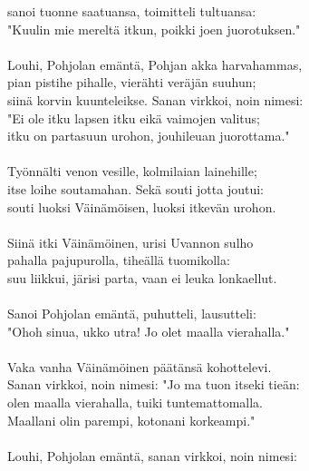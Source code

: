 sanoi tuonne saatuansa, toimitteli tultuansa:             \\
"Kuulin mie mereltä itkun, poikki joen juorotuksen."      \\
                                                          \\
Louhi, Pohjolan emäntä, Pohjan akka harvahammas,          \\
pian pistihe pihalle, vierähti veräjän suuhun;            \\
siinä korvin kuunteleikse. Sanan virkkoi, noin nimesi:    \\
"Ei ole itku lapsen itku eikä vaimojen valitus;           \\
itku on partasuun urohon, jouhileuan juorottama."         \\
                                                          \\
Työnnälti venon vesille, kolmilaian lainehille;           \\
itse loihe soutamahan. Sekä souti jotta joutui:           \\
souti luoksi Väinämöisen, luoksi itkevän urohon.          \\
                                                          \\
Siinä itki Väinämöinen, urisi Uvannon sulho               \\
pahalla pajupurolla, tiheällä tuomikolla:                 \\
suu liikkui, järisi parta, vaan ei leuka lonkaellut.      \\
                                                          \\
Sanoi Pohjolan emäntä, puhutteli, lausutteli:             \\
"Ohoh sinua, ukko utra! Jo olet maalla vierahalla."       \\
                                                          \\
Vaka vanha Väinämöinen päätänsä kohottelevi.              \\
Sanan virkkoi, noin nimesi: "Jo ma tuon itseki tieän:     \\
olen maalla vierahalla, tuiki tuntemattomalla.            \\
Maallani olin parempi, kotonani korkeampi."               \\
                                                          \\
Louhi, Pohjolan emäntä, sanan virkkoi, noin nimesi:       \\
